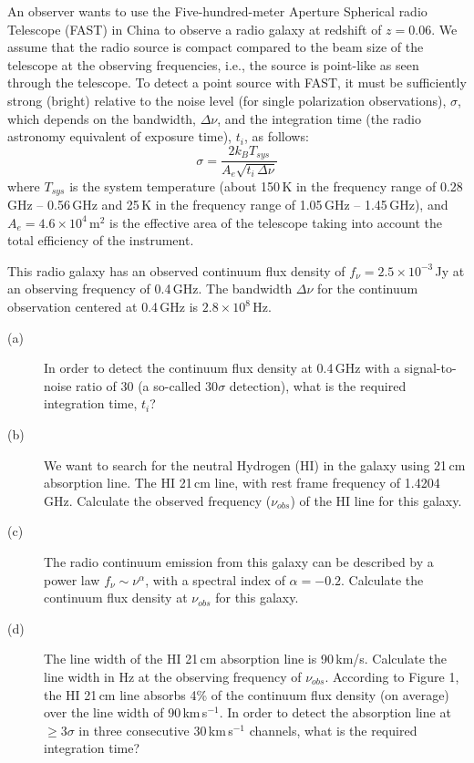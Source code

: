 An observer wants to use the Five-hundred-meter Aperture Spherical radio
Telescope (FAST) in China to observe a radio galaxy at redshift of $z = 0.06$.
We assume that the radio source is compact compared to the beam size of the
telescope at the observing frequencies, i.e., the source is point-like as seen
through the telescope. To detect a point source with FAST, it must be
sufficiently strong (bright) relative to the noise level (for single
polarization observations), $\sigma$, which depends on the bandwidth,
$\Delta\nu$, and the integration time (the radio astronomy equivalent of
exposure time), $t_i$, as follows:
\[ \sigma = \frac{2 k_B T_{sys}}{A_e \sqrt{t_i\,\Delta\nu}} \]
where $T_{sys}$ is the system temperature (about 150\,K in the frequency range
of 0.28\,GHz -- 0.56\,GHz and 25\,K in the frequency range of 1.05\,GHz --
1.45\,GHz), and $A_e = 4.6 \times 10^4\,\mathrm{m}^2$ is the effective area of
the telescope taking into account the total efficiency of the instrument.

This radio galaxy has an observed continuum flux density of
$f_\nu = 2.5 \times 10^{-3}$\,Jy at an observing frequency of 0.4\,GHz. The
bandwidth $\Delta\nu$ for the continuum observation centered at 0.4\,GHz is
$2.8 \times 10^8$\,Hz.

\begin{description}
\item[(a)] In order to detect the continuum flux density at 0.4\,GHz with a
  signal-to-noise ratio of 30 (a so-called 30$\sigma$ detection), what is the
  required integration time, $t_i$?
\item[(b)] We want to search for the neutral Hydrogen (HI) in the galaxy using
  21\,cm absorption line. The HI 21\,cm line, with rest frame frequency of
  1.4204\,GHz. Calculate the observed frequency ($\nu_{obs}$) of the HI line
  for this galaxy.
\item[(c)] The radio continuum emission from this galaxy can be described by a
  power law $f_\nu \sim \nu^\alpha$, with a spectral index of $\alpha = -0.2$.
  Calculate the continuum flux density at $\nu_{obs}$ for this galaxy.
\item[(d)] The line width of the HI 21\,cm absorption line is 90\,km/s.
  Calculate the line width in Hz at the observing frequency of $\nu_{obs}$.
  According to Figure 1, the HI 21\,cm line absorbs 4\% of the continuum flux
  density (on average) over the line width of 90\,km\,s$^{-1}$. In order to
  detect the absorption line at $\geq 3\sigma$ in three consecutive
  30\,km\,s$^{-1}$ channels, what is the required integration time?
\end{description}

